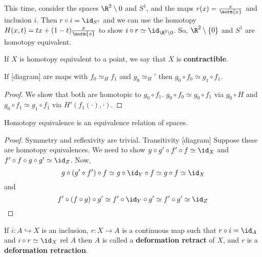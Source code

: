 \documentclass{article}
\numberwithin{nthm}{subsection}
\begin{document}
\begin{eg}
    This time, consider the spaces $\R^2 \setminus {0}$ and $S^1$, and the maps $r(x) = \frac{x}{\norm{x}}$  and inclusion $i$.  Then $r \circ i = \id_{S^1}$ and we can use the homotopy $H(x, t) = tx + (1-t) \frac{x}{\norm{x}}$ to show $i \circ r \simeq \id_{\R^2 \setminus {0}}$.  So, $\R^2 \setminus \{0\}$ and $S^1$ are homotopy equivalent.
\end{eg}

\begin{ndef}
    If $X$ is homotopy equivalent to a point, we say that $X$ is \textbf{contractible}.
\end{ndef}

\begin{nlemma}
    If
    [diagram]
    are maps with $f_0 \simeq_H f_1$ and $g_0 \simeq_H'$ then $g_0 \circ f_0 \simeq g_1 \circ f_1$.
\end{nlemma}

\begin{proof}
    We show that both are homotopic to $g_0 \circ f_1$.  $g_0 \circ f_0 \simeq g_0 \circ f_1$ via $g_0 \circ H$ and $g_0 \circ f_1 \simeq g_1 \circ f_1$ via $H'(f_1(\cdot), \cdot)$.
\end{proof}

\begin{prop}
    Homotopy equivalence is an equivalence relation of spaces.
\end{prop}

\begin{proof}
    Symmetry and reflexivity are trivial. Transitivity [diagram]
    Suppose these are homotopy equivalences. We need to show $g \circ g' \circ f' \circ f \simeq \id_X$ and $f' \circ f \circ g \circ g' \simeq \id_Z$.
    Now,
    \begin{equation*}
        g \circ (g' \circ f') \circ f \simeq g \circ \id_Y \circ f \simeq g \circ f \simeq \id_X \\
    \end{equation*}
    and
    \begin{equation*}
        f' \circ (f \circ g) \circ g' \simeq f' \circ \id_Y \circ g' \simeq f' \circ g' \simeq \id_Z \\
    \end{equation*}
\end{proof}

\begin{ndef}
    If $i: A \hookrightarrow X$ is an inclusion, $r: X \to A$ is a continuous map such that $r \circ i = \id_A$ and $i \circ r \simeq \id_X$ rel $A$ then $A$ is called a \textbf{deformation retract} of $X$, and $r$ is a \textbf{deformation retraction}.
\end{ndef}
\end{document}
